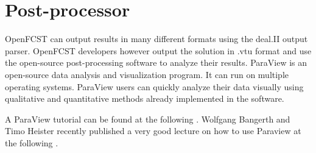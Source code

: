 \chapter{Post-processor}

OpenFCST can output results in many different formats using the deal.II output parser. OpenFCST developers however output the solution in .vtu format and use the open-source post-processing software  to analyze their results. ParaView is an open-source data analysis and visualization program. It can run on multiple operating systems.
ParaView users can quickly analyze their data visually using qualitative and quantitative methods already implemented in the software. 

A ParaView tutorial can be found at the following . Wolfgang Bangerth and Timo Heister recently published a very good lecture on how to use Paraview at the following .

